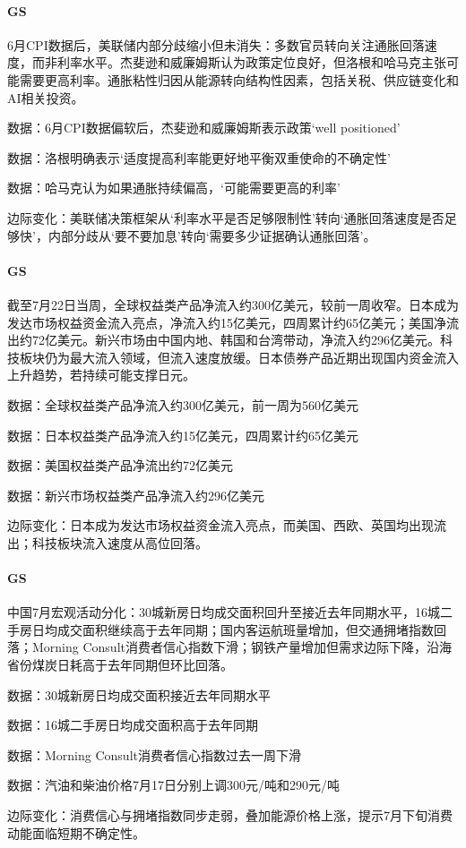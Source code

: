\documentclass[11pt]{ctexart}
\begin{document}
\paragraph{GS} 6月CPI数据后，美联储内部分歧缩小但未消失：多数官员转向关注通胀回落速度，而非利率水平。杰斐逊和威廉姆斯认为政策定位良好，但洛根和哈马克主张可能需要更高利率。通胀粘性归因从能源转向结构性因素，包括关税、供应链变化和AI相关投资。
{\small\color{refgray}数据：6月CPI数据偏软后，杰斐逊和威廉姆斯表示政策‘well positioned’\par}
{\small\color{refgray}数据：洛根明确表示‘适度提高利率能更好地平衡双重使命的不确定性’\par}
{\small\color{refgray}数据：哈马克认为如果通胀持续偏高，‘可能需要更高的利率’\par}
{\small\color{refgray}边际变化：美联储决策框架从‘利率水平是否足够限制性’转向‘通胀回落速度是否足够快’，内部分歧从‘要不要加息’转向‘需要多少证据确认通胀回落’。\par}
\paragraph{GS} 截至7月22日当周，全球权益类产品净流入约300亿美元，较前一周收窄。日本成为发达市场权益资金流入亮点，净流入约15亿美元，四周累计约65亿美元；美国净流出约72亿美元。新兴市场由中国内地、韩国和台湾带动，净流入约296亿美元。科技板块仍为最大流入领域，但流入速度放缓。日本债券产品近期出现国内资金流入上升趋势，若持续可能支撑日元。
{\small\color{refgray}数据：全球权益类产品净流入约300亿美元，前一周为560亿美元\par}
{\small\color{refgray}数据：日本权益类产品净流入约15亿美元，四周累计约65亿美元\par}
{\small\color{refgray}数据：美国权益类产品净流出约72亿美元\par}
{\small\color{refgray}数据：新兴市场权益类产品净流入约296亿美元\par}
{\small\color{refgray}边际变化：日本成为发达市场权益资金流入亮点，而美国、西欧、英国均出现流出；科技板块流入速度从高位回落。\par}
\paragraph{GS} 中国7月宏观活动分化：30城新房日均成交面积回升至接近去年同期水平，16城二手房日均成交面积继续高于去年同期；国内客运航班量增加，但交通拥堵指数回落；Morning Consult消费者信心指数下滑；钢铁产量增加但需求边际下降，沿海省份煤炭日耗高于去年同期但环比回落。
{\small\color{refgray}数据：30城新房日均成交面积接近去年同期水平\par}
{\small\color{refgray}数据：16城二手房日均成交面积高于去年同期\par}
{\small\color{refgray}数据：Morning Consult消费者信心指数过去一周下滑\par}
{\small\color{refgray}数据：汽油和柴油价格7月17日分别上调300元/吨和290元/吨\par}
{\small\color{refgray}边际变化：消费信心与拥堵指数同步走弱，叠加能源价格上涨，提示7月下旬消费动能面临短期不确定性。\par}
\end{document}
